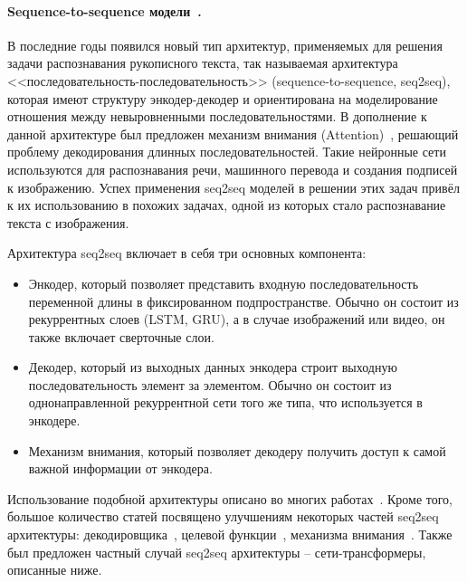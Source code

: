 \paragraph{Sequence-to-sequence модели~\cite{sutskever2014sequence}.}{
    В последние годы появился новый тип архитектур, применяемых для решения задачи распознавания рукописного текста,
    так называемая архитектура <<последовательность-последовательность>> (sequence-to-sequence, seq2seq),
    которая имеют структуру энкодер-декодер и ориентирована на моделирование отношения между невыровненными последовательностями.
    В дополнение к данной архитектуре был предложен механизм внимания (Attention)~\cite{bahdanau2014neural},
    решающий проблему декодирования длинных последовательностей.
    Такие нейронные сети используются для распознавания речи, машинного перевода и создания подписей к изображению.
    Успех применения seq2seq моделей в решении этих задач привёл к их использованию в похожих задачах,
    одной из которых стало распознавание текста с изображения.

    Архитектура seq2seq включает в себя три основных компонента:
    \begin{itemize}
        \item Энкодер, который позволяет представить входную последовательность переменной длины в фиксированном подпространстве.
        Обычно он состоит из рекуррентных слоев (LSTM, GRU), а в случае изображений или видео, он также включает сверточные слои.
        \item Декодер, который из выходных данных энкодера строит выходную последовательность элемент за элементом.
        Обычно он состоит из однонаправленной рекуррентной сети того же типа, что используется в энкодере.
        \item Механизм внимания, который позволяет декодеру получить доступ к самой важной информации от энкодера.
    \end{itemize}

    Использование подобной архитектуры описано во многих работах~\cite{sueiras2018offline, kang2019convolve, kass2022attentionhtr}.
    Кроме того, большое количество статей посвящено улучшениям некоторых частей seq2seq архитектуры:
    декодировщика~\cite{chowdhury2018efficient,kang2021candidate}, целевой функции~\cite{chowdhury2018efficient}, механизма внимания~\cite{michael2019evaluating}.
    Также был предложен частный случай seq2seq архитектуры -- сети-трансформеры, описанные ниже.
}

